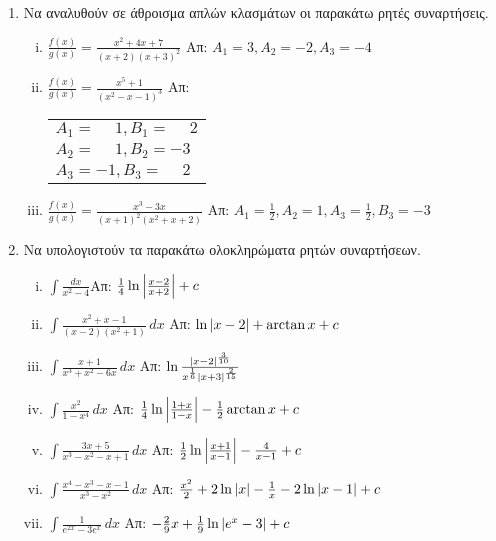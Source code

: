 \documentclass[a4paper,12pt]{article}
\begin{document}
\begin{center}
\end{center}

\vspace{\baselineskip}

\begin{enumerate}
	\item \label{ask:anal} Να αναλυθούν σε άθροισμα απλών κλασμάτων οι παρακάτω ρητές συναρτήσεις.
\begin{enumerate}[i)]
\item $\frac{f(x)}{g(x)}=\frac{x^2+4x+7}{(x+2)(x+3)^2}$ \hfill Απ: $A_1=3, A_2=-2, A_3=-4$
\item $\frac{f(x)}{g(x)}=\frac{x^5+1}{(x^2-x-1)^3}$ \hfill Απ: \begin{tabular}{l} 
$A_1=\phantom{-}1, B_1=\phantom{-}2$ \\ $A_2=\phantom{-}1, B_2=-3$ \\ $A_3=-1, B_3=\phantom{-}2$
\end{tabular}
\item $\frac{f(x)}{g(x)}=\frac{x^3-3x}{(x+1)^2(x^2+x+2)}$ \hfill Απ: $A_1=\frac{1}{2}, A_2=1, A_3=\frac{1}{2}, B_3=-3$
\end{enumerate}



\item \label{ask:rhtes} Να υπολογιστούν τα παρακάτω ολοκληρώματα ρητών συναρτήσεων.

\begin{enumerate}[i)]
\item $\int\frac{dx}{x^2-4}$\hfill Απ: $\frac{1}{4}\ln\abs{\frac{x-2}{x+2}}+c$
\item $\int\frac{x^2+x-1}{(x-2)(x^2+1)}\,dx$ \hfill Απ: $\ln\abs{x-2}+\arctan x+c$
\item $\int\frac{x+1}{x^3+x^2-6x}\,dx$ \hfill Απ: $\ln\frac{\abs{x-2}^{\frac{3}{10}}}{x^{\frac{1}{6}}\abs{x+3}^{\frac{2}{15}}}$
\item $\int\frac{x^2}{1-x^4}\,dx$ \hfill Απ: $\frac{1}{4}\ln\abs{\frac{1+x}{1-x}}-\frac{1}{2}\arctan x+c$
\item $\int\frac{3x+5}{x^3-x^2-x+1}\, dx$ \hfill Απ: $\frac{1}{2}\ln\abs{\frac{x+1}{x-1}}-\frac{4}{x-1}+c$ 
\item $\int\frac{x^4-x^3-x-1}{x^3-x^2}\,dx$ \hfill Απ: $\frac{x^2}{2}+2\ln\abs{x}-\frac{1}{x}-2\ln\abs{x-1}+c$
\item \label{ex:seven} $\int\frac{1}{e^{2x}-3e^{x}}\,dx$ \hfill Απ: $-\frac{2}{9}x+\frac{1}{9}\ln\abs{e^x-3}+c$
\end{enumerate}




\end{enumerate}
\end{document}

